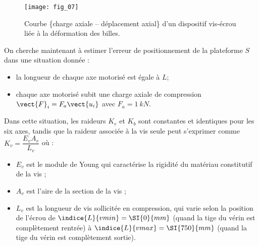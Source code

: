 \begin{figure}[H]
\centering
\texttt{[image: fig\_07]}
\caption{\label{fig:07}  Courbe \{charge axiale -- déplacement axial\} d’un dispositif vis-écrou liée à la
déformation des billes.}
\end{figure}


\ifprof
\begin{corrige}
\end{corrige}
\else
\fi


On cherche maintenant à estimer l’erreur de positionnement de la plateforme $S$ dans une situation donnée :
\begin{itemize}
\item la longueur de chaque axe motorisé est égale à $L$;
\item chaque axe motorisé subit une charge axiale de compression $\vect{F}_i=F_a \vect{u_i}$ avec $F_a = \SI{1}{kN}$.
\end{itemize}

Dans cette situation, les raideurs $K_e$ et $K_b$ sont constantes et identiques pour les six axes, tandis que la raideur associée à la vis seule peut s’exprimer comme $K_v = \dfrac{E_v A_v}{L_v}$ où :
\begin{itemize}
\item $E_v$ est le module de Young qui caractérise la rigidité du matériau constitutif de la vis ;
\item $A_v$ est l’aire de la section de la vis ;
\item $L_v$ est la longueur de vis sollicitée en compression, qui varie selon la position de l’écrou de $\indice{L}{v min}= \SI{0}{mm}$ (quand la tige du vérin est complètement rentrée) à $\indice{L}{v max}= \SI{750}{mm}$ (quand la tige du vérin est complètement
sortie).
\end{itemize}

\ifprof
\begin{corrige}
\end{corrige}
\else
\fi


\ifprof
\begin{corrige}
\end{corrige}
\else
\fi


